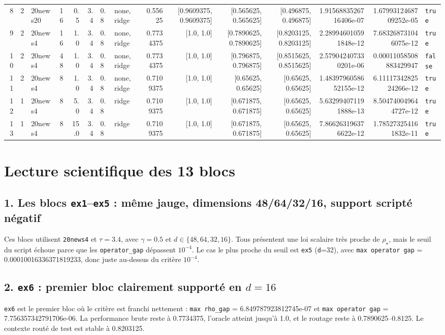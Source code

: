 \documentclass[11pt,a4paper]{article}
\newcommand{\code}[1]{\texttt{#1}}
\begin{document}
\begin{landscape}
\begin{longtable}{r r l r r r l l r r r r r r l}
8 & 2 & 20news20 & 16 & 0.5 & 3.4 & 0.8 & none, ridge & 0.55625 & [0.9609375, 0.9609375] & [0.565625, 0.565625] & [0.496875, 0.496875] & 1.9156883526716406e-07 & 1.6799312468709252e-05 & \texttt{true} \\
9 & 2 & 20news4 & 16 & 1.0 & 3.4 & 0.8 & none, ridge & 0.7734375 & [1.0, 1.0] & [0.7890625, 0.7890625] & [0.8203125, 0.8203125] & 2.289946010591848e-12 & 7.683268731046075e-12 & \texttt{true} \\
10 & 2 & 20news4 & 48 & 1.0 & 3.4 & 0.8 & none, ridge & 0.7734375 & [1.0, 1.0] & [0.796875, 0.796875] & [0.8515625, 0.8515625] & 2.579042407330201e-06 & 0.00011058508883429947 & \texttt{false} \\
11 & 2 & 20news4 & 8 & 1.0 & 3.4 & 0.8 & none, ridge & 0.7109375 & [1.0, 1.0] & [0.65625, 0.65625] & [0.65625, 0.65625] & 1.4839796058652155e-12 & 6.1111734282524266e-12 & \texttt{true} \\
12 & 1 & 20news4 & 8 & 5.0 & 3.4 & 0.8 & ridge & 0.7109375 & [1.0, 1.0] & [0.671875, 0.671875] & [0.65625, 0.65625] & 5.632994071191888e-13 & 8.504740049644727e-12 & \texttt{true} \\
13 & 1 & 20news4 & 8 & 15.0 & 3.4 & 0.8 & ridge & 0.7109375 & [1.0, 1.0] & [0.671875, 0.671875] & [0.65625, 0.65625] & 7.866263196376622e-12 & 1.785273254161832e-11 & \texttt{true} \\
\end{longtable}
\end{landscape}
\section*{Lecture scientifique des 13 blocs}
\subsection*{1. Les blocs \code{ex1}--\code{ex5} : même jauge, dimensions 48/64/32/16, support scripté négatif}
Ces blocs utilisent \code{20news4} et $\tau=3.4$, avec $\gamma=0.5$ et $d\in\{48,64,32,16\}$. Tous présentent une loi scalaire très proche de $\rho_\star$, mais le seuil du script échoue parce que les \code{operator\_gap} dépassent $10^{-4}$. Le cas le plus proche du seuil est \code{ex5} (\code{d}=32), avec \code{max operator gap} = 0.00010016336371819233, donc juste au-dessus du critère $10^{-4}$.
\subsection*{2. \code{ex6} : premier bloc clairement supporté en $d=16$}
\code{ex6} est le premier bloc où le critère est franchi nettement : \code{max rho\_gap} = 6.849787923812745e-07 et \code{max operator gap} = 7.756357342791706e-06. La performance brute reste à 0.7734375, l'oracle atteint jusqu'à 1.0, et le routage reste à 0.7890625--0.8125. Le contexte routé de test est stable à 0.8203125.
\end{document}
